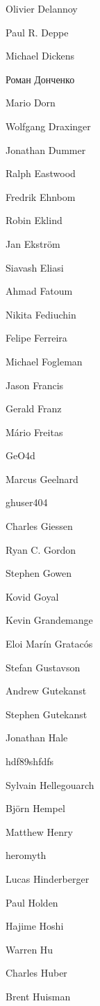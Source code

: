 \begin{DoxyItemize}
\item Olivier Delannoy
\item Paul R. Deppe
\item Michael Dickens
\item Роман Донченко
\item Mario Dorn
\item Wolfgang Draxinger
\item Jonathan Dummer
\item Ralph Eastwood
\item Fredrik Ehnbom
\item Robin Eklind
\item Jan Ekström
\item Siavash Eliasi
\item Ahmad Fatoum
\item Nikita Fediuchin
\item Felipe Ferreira
\item Michael Fogleman
\item Jason Francis
\item Gerald Franz
\item Mário Freitas
\item Ge\+O4d
\item Marcus Geelnard
\item ghuser404
\item Charles Giessen
\item Ryan C. Gordon
\item Stephen Gowen
\item Kovid Goyal
\item Kevin Grandemange
\item Eloi Marín Gratacós
\item Stefan Gustavson
\item Andrew Gutekanst
\item Stephen Gutekanst
\item Jonathan Hale
\item hdf89shfdfs
\item Sylvain Hellegouarch
\item Björn Hempel
\item Matthew Henry
\item heromyth
\item Lucas Hinderberger
\item Paul Holden
\item Hajime Hoshi
\item Warren Hu
\item Charles Huber
\item Brent Huisman

\end{DoxyItemize}

